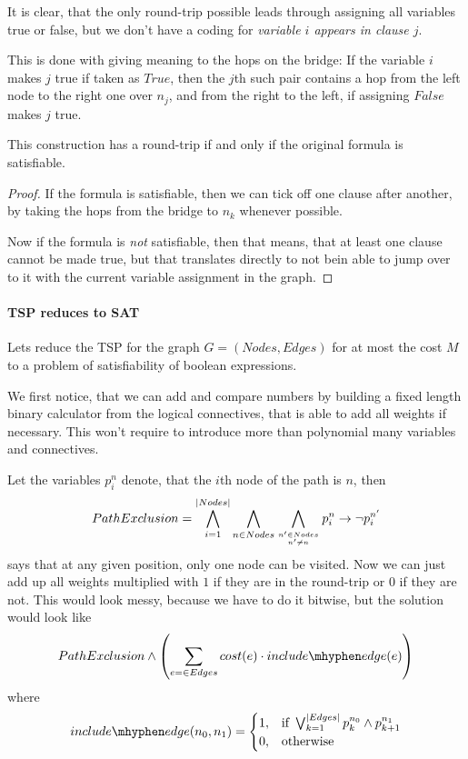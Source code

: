 It is clear, that the only 
round-trip possible leads through assigning all variables true or false, but 
we don't have a coding for \emph{variable $i$ appears in clause $j$}. 

This is done with giving meaning to the hops on the bridge: If the variable 
$i$ makes $j$ true if taken as $True$, then the $j$th such pair contains 
a hop from the left node to the right one over $n_j$, and from the right to 
the left, if assigning $False$ makes $j$ true.

\begin{theorem}
	This construction has a round-trip if and only if the original formula is satisfiable.
\end{theorem}
\begin{proof}
	If the formula is satisfiable, then we can tick off one clause after 
	another, by taking the hops from the bridge to $n_k$ whenever possible. 

	Now if the formula is \emph{not} satisfiable, then that means, that at 
	least one clause cannot be made true, but that translates directly to not 
	bein able to jump over to it with the current variable assignment in the graph.
\end{proof}
\paragraph{TSP reduces to SAT}
Lets reduce the TSP for the graph $G = (Nodes, Edges)$ for at most the cost
$M$ to a problem of satisfiability of boolean expressions.

We first notice, that we can add and compare numbers by building a fixed 
length binary calculator from the logical connectives, that is able to add 
all weights if necessary. This won't require to introduce more than 
polynomial many variables and connectives.

Let the variables $p_i^n$ denote, that the $i$th node of the path is $n$, 
then 
\[ PathExclusion = \bigwedge_{i=1}^{\left|Nodes\right|}\bigwedge_{n\in Nodes} \bigwedge_{n'\in Nodes\atop n'\neq n} p_i^n \rightarrow \lnot p_i^{n'}\]
says that at any given position, only one node can be visited. Now we can 
just add up all weights multiplied with $1$ if they are in the round-trip or 
$0$ if they are not. This would look messy, because we have to do it bitwise, 
but the solution would look like
\[
	PathExclusion \wedge \left( \sum_{e=\in Edges} cost(e)\cdot 
	include\mhyphen edge(e) \right) \]
where 
\[ include\mhyphen edge(n_0, n_1)= \begin{cases}
		1, &\text{if }\bigvee_{k=1}^{\abs{Edges}} p_k^{n_0} \wedge p_{k+1}^{n_1}\\
		0, &\text{otherwise }
	\end{cases}\]

